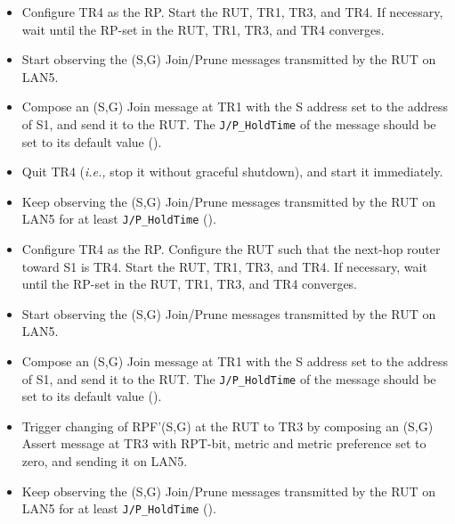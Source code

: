 \documentclass[11pt]{report}
\newcommand{\ie}{\emph{i.e.,}\xspace}
\begin{document}

\begin{itemize}

  \item Configure TR4 as the RP. Start the RUT, TR1, TR3, and TR4. If
  necessary, wait until the RP-set in the RUT, TR1, TR3, and TR4
  converges.

  \item Start observing the (S,G) Join/Prune messages transmitted by the
  RUT on LAN5.

  \item Compose an (S,G) Join message at TR1 with the S address set to the
  address of S1, and send it to the RUT. 
  The \verb=J/P_HoldTime= of the message should be set to its default
  value ({\PimsmJPHoldTime}).

  \item Quit TR4 (\ie stop it without graceful shutdown), and start it
  immediately.

  \item Keep observing the (S,G) Join/Prune messages transmitted by the
  RUT on LAN5 for at least \verb=J/P_HoldTime= ({\PimsmJPHoldTime}).

\end{itemize}


\begin{itemize}

  \item Configure TR4 as the RP.
  Configure the RUT such that the next-hop router toward S1 is TR4.
  Start the RUT, TR1, TR3, and TR4.
  If necessary, wait until the RP-set in the RUT, TR1, TR3, and TR4
  converges.

  \item Start observing the (S,G) Join/Prune messages transmitted by the
  RUT on LAN5.

  \item Compose an (S,G) Join message at TR1 with the S address set to the
  address of S1, and send it to the RUT. 
  The \verb=J/P_HoldTime= of the message should be set to its default
  value ({\PimsmJPHoldTime}).

  \item Trigger changing of RPF'(S,G) at the RUT to TR3 by composing an
  (S,G) Assert message at TR3 with RPT-bit, metric and metric 
  preference set to zero, and sending it on LAN5.

  \item Keep observing the (S,G) Join/Prune messages transmitted by the
  RUT on LAN5 for at least \verb=J/P_HoldTime= ({\PimsmJPHoldTime}).

\end{itemize}
\end{document}
